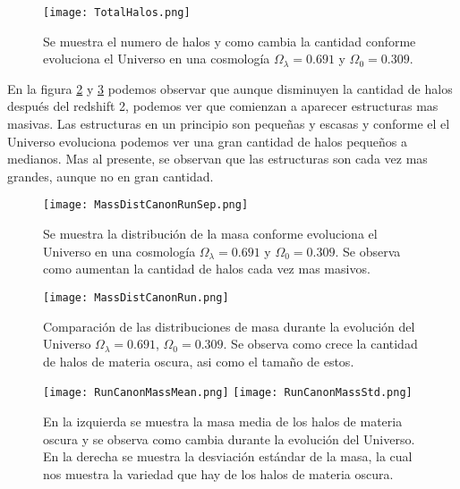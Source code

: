 \begin{figure}
    \centering
    \texttt{[image: TotalHalos.png]}
    \caption[Evolución del número de halos en un Universo $\Omega_\lambda = 0.691 $, $\Omega_0 = 0.309$]{\small Se muestra el numero de halos y como cambia la cantidad conforme evoluciona el Universo en una cosmología $\Omega_\lambda = 0.691 $ y $\Omega_0 = 0.309$.}
    \label{fig:EvoNumTotHalos}
\end{figure}

En la figura \ref{fig:MassDistCanonRunSep} y \ref{fig:MassDistCanonRun} podemos observar que aunque disminuyen la cantidad de halos después del redshift 2, podemos ver que comienzan a aparecer estructuras mas masivas. Las estructuras en un principio son pequeñas y escasas y conforme el el Universo evoluciona podemos ver una gran cantidad de halos pequeños a medianos. Mas al presente, se observan que las estructuras son cada vez mas grandes, aunque no en gran cantidad.

\begin{figure}
    \centering
    \texttt{[image: MassDistCanonRunSep.png]}
    \caption[Distribución de masa en la evolución de un Universo $\Omega_\lambda = 0.691 $, $\Omega_0 = 0.309$]{\small Se muestra la distribución de la masa conforme evoluciona el Universo en una cosmología $\Omega_\lambda = 0.691 $ y $\Omega_0 = 0.309$. Se observa como aumentan la cantidad de halos cada vez mas masivos.}
    \label{fig:MassDistCanonRunSep}
\end{figure}

\begin{figure}
    \centering
    \texttt{[image: MassDistCanonRun.png]}
    \caption[Comparación de distribución de masa Universo $\Omega_\lambda = 0.691 $, $\Omega_0 = 0.309$]{\small Comparación de las distribuciones de masa durante la evolución del Universo $\Omega_\lambda = 0.691 $, $\Omega_0 = 0.309$. Se observa como crece la cantidad de halos de materia oscura, asi como el tamaño de estos.}
    \label{fig:MassDistCanonRun}
\end{figure}


\begin{figure}
    \centering
    \texttt{[image: RunCanonMassMean.png]}
    \texttt{[image: RunCanonMassStd.png]}
    \caption[Media y desviación estándar de la distribución de masa de un Universo $\Omega_\lambda = 0.691 $, $\Omega_0 = 0.309$]{\small En la izquierda se muestra la masa media de los halos de materia oscura y se observa como cambia durante la evolución del Universo. En la derecha se muestra la desviación estándar de la masa, la cual nos muestra la variedad que hay de los halos de materia oscura.}
    \label{fig:MassStatsCanonRun}
\end{figure}

